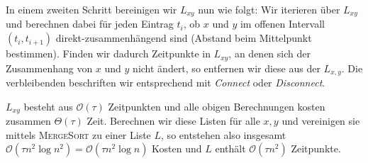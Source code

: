 In einem zweiten Schritt bereinigen wir $L_{xy}$ nun wie folgt: Wir iterieren über $L_{xy}$ und berechnen dabei für jeden Eintrag $t_i$, ob $x$ und $y$ im offenen Intervall $(t_i,t_{i+1})$ direkt-zusammenhängend sind (Abstand beim Mittelpunkt bestimmen). 
Finden wir dadurch Zeitpunkte in $L_{xy}$, an denen sich der Zusammenhang von $x$ und $y$ nicht ändert, so entfernen wir diese aus der $L_{x,y}$.
Die verbleibenden beschriften wir entsprechend mit \emph{Connect} oder \emph{Disconnect}.

$L_{xy}$ besteht aus $\mathcal{O}(\tau)$ Zeitpunkten und alle obigen Berechnungen kosten zusammen $\Theta(\tau)$ Zeit.
Berechnen wir diese Listen für alle $x,y$ und vereinigen sie mittels \textsc{MergeSort} zu einer Liste $L$, so entstehen also insgesamt $\mathcal{O}(\tau n^2 \log n^2) = \mathcal{O}(\tau n^2 \log n)$ Kosten und $L$ enthält $\mathcal{O}(\tau n^2)$ Zeitpunkte.


